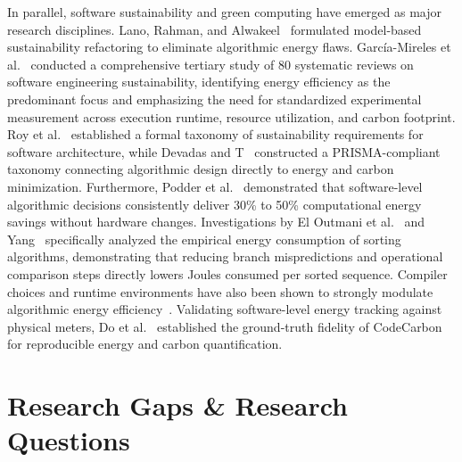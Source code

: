 \documentclass[journal]{IEEEtran}
\begin{document}
In parallel, software sustainability and green computing have emerged as major research disciplines. Lano, Rahman, and Alwakeel~\cite{lano2026model} formulated model-based sustainability refactoring to eliminate algorithmic energy flaws. Garc\'ia-Mireles et al.~\cite{garciamireles2026sustainability} conducted a comprehensive tertiary study of 80 systematic reviews on software engineering sustainability, identifying energy efficiency as the predominant focus and emphasizing the need for standardized experimental measurement across execution runtime, resource utilization, and carbon footprint. Roy et al.~\cite{roy2026taxonomy} established a formal taxonomy of sustainability requirements for software architecture, while Devadas and T~\cite{devadas2026carbon} constructed a PRISMA-compliant taxonomy connecting algorithmic design directly to energy and carbon minimization. Furthermore, Podder et al.~\cite{podder2026green} demonstrated that software-level algorithmic decisions consistently deliver 30\% to 50\% computational energy savings without hardware changes. Investigations by El Outmani et al.~\cite{eloutmani2025energy} and Yang~\cite{yang2025holistic} specifically analyzed the empirical energy consumption of sorting algorithms, demonstrating that reducing branch mispredictions and operational comparison steps directly lowers Joules consumed per sorted sequence. Compiler choices and runtime environments have also been shown to strongly modulate algorithmic energy efficiency~\cite{bylina2025importance,jimenez2025compiler,pulido2025pypen,ijaz2025energy,farina2025compression}. Validating software-level energy tracking against physical meters, Do et al.~\cite{codecarbon2025groundtruthing} established the ground-truth fidelity of CodeCarbon~\cite{schmidt2021codecarbon} for reproducible energy and carbon quantification.

\section{Research Gaps \& Research Questions}
\end{document}
